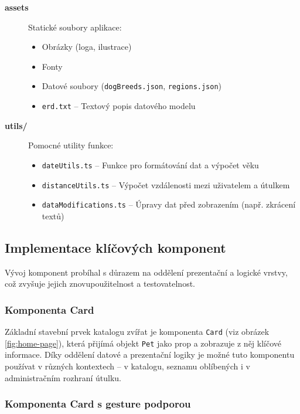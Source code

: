 \documentclass[czech, bp, kiv, he, iso690numb, pdf]{fasthesis}
\begin{document}
\begin{description}
        \item[\textbf{assets\/}] Statické soubory aplikace:
        \begin{itemize}
            \item Obrázky (loga, ilustrace)
            \item Fonty
            \item Datové soubory (\texttt{dogBreeds.json}, \texttt{regions.json})
            \item \texttt{erd.txt} -- Textový popis datového modelu
        \end{itemize}

        \item[\textbf{utils/}] Pomocné utility funkce:
        \begin{itemize}
            \item \texttt{dateUtils.ts} -- Funkce pro formátování dat a výpočet věku
            \item \texttt{distanceUtils.ts} -- Výpočet vzdálenosti mezi uživatelem a útulkem
            \item \texttt{dataModifications.ts} -- Úpravy dat před zobrazením (např. zkrácení textů)
        \end{itemize}
    \end{description}

    \subsection{Implementace klíčových komponent}

    Vývoj komponent probíhal s důrazem na oddělení prezentační a logické vrstvy, což zvyšuje jejich znovupoužitelnost a testovatelnost.

    \subsubsection*{Komponenta Card}

    Základní stavební prvek katalogu zvířat je komponenta \texttt{Card} (viz obrázek \ref{fig:home-page}), která přijímá objekt \texttt{Pet} jako prop a zobrazuje z něj klíčové informace. Díky oddělení datové a prezentační logiky je možné tuto komponentu používat v různých kontextech -- v katalogu, seznamu oblíbených i v administračním rozhraní útulku.


    \subsubsection*{Komponenta Card s gesture podporou}
\end{document}

